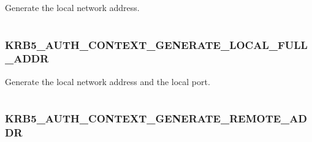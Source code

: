 \documentclass[letterpaper,10pt,english]{sphinxmanual}
\begin{document}
Generate the local network address.

\begin{tabulary}{\linewidth}{|L|L|}
\hline

 & 
\\\hline
\end{tabulary}



\subsubsection{KRB5\_AUTH\_CONTEXT\_GENERATE\_LOCAL\_FULL\_ADDR}
\label{appdev/refs/macros/KRB5_AUTH_CONTEXT_GENERATE_LOCAL_FULL_ADDR:krb5-auth-context-generate-local-full-addr}\label{appdev/refs/macros/KRB5_AUTH_CONTEXT_GENERATE_LOCAL_FULL_ADDR:krb5-auth-context-generate-local-full-addr-data}\label{appdev/refs/macros/KRB5_AUTH_CONTEXT_GENERATE_LOCAL_FULL_ADDR::doc}

\begin{fulllineitems}
\label{appdev/refs/macros/KRB5_AUTH_CONTEXT_GENERATE_LOCAL_FULL_ADDR:KRB5_AUTH_CONTEXT_GENERATE_LOCAL_FULL_ADDR}
\end{fulllineitems}


Generate the local network address and the local port.

\begin{tabulary}{\linewidth}{|L|L|}
\hline

 & 
\\\hline
\end{tabulary}



\subsubsection{KRB5\_AUTH\_CONTEXT\_GENERATE\_REMOTE\_ADDR}
\label{appdev/refs/macros/KRB5_AUTH_CONTEXT_GENERATE_REMOTE_ADDR:krb5-auth-context-generate-remote-addr-data}\label{appdev/refs/macros/KRB5_AUTH_CONTEXT_GENERATE_REMOTE_ADDR:krb5-auth-context-generate-remote-addr}\label{appdev/refs/macros/KRB5_AUTH_CONTEXT_GENERATE_REMOTE_ADDR::doc}

\begin{fulllineitems}
\label{appdev/refs/macros/KRB5_AUTH_CONTEXT_GENERATE_REMOTE_ADDR:KRB5_AUTH_CONTEXT_GENERATE_REMOTE_ADDR}
\end{fulllineitems}
\end{document}
